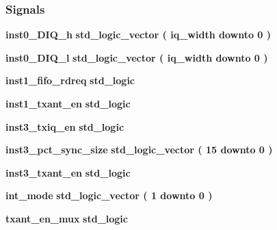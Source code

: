 \subsubsection*{Signals}
 \begin{DoxyCompactItemize}
\item 
{\bf inst0\+\_\+\+D\+I\+Q\+\_\+h} {\bfseries \textcolor{comment}{std\+\_\+logic\+\_\+vector}\textcolor{vhdlchar}{ }\textcolor{vhdlchar}{(}\textcolor{vhdlchar}{ }\textcolor{vhdlchar}{ }\textcolor{vhdlchar}{ }\textcolor{vhdlchar}{ }{\bfseries {\bf iq\+\_\+width}} \textcolor{vhdlchar}{ }\textcolor{keywordflow}{downto}\textcolor{vhdlchar}{ }\textcolor{vhdlchar}{ } \textcolor{vhdldigit}{0} \textcolor{vhdlchar}{ }\textcolor{vhdlchar}{)}\textcolor{vhdlchar}{ }} 
\item 
{\bf inst0\+\_\+\+D\+I\+Q\+\_\+l} {\bfseries \textcolor{comment}{std\+\_\+logic\+\_\+vector}\textcolor{vhdlchar}{ }\textcolor{vhdlchar}{(}\textcolor{vhdlchar}{ }\textcolor{vhdlchar}{ }\textcolor{vhdlchar}{ }\textcolor{vhdlchar}{ }{\bfseries {\bf iq\+\_\+width}} \textcolor{vhdlchar}{ }\textcolor{keywordflow}{downto}\textcolor{vhdlchar}{ }\textcolor{vhdlchar}{ } \textcolor{vhdldigit}{0} \textcolor{vhdlchar}{ }\textcolor{vhdlchar}{)}\textcolor{vhdlchar}{ }} 
\item 
{\bf inst1\+\_\+fifo\+\_\+rdreq} {\bfseries \textcolor{comment}{std\+\_\+logic}\textcolor{vhdlchar}{ }} 
\item 
{\bf inst1\+\_\+txant\+\_\+en} {\bfseries \textcolor{comment}{std\+\_\+logic}\textcolor{vhdlchar}{ }} 
\item 
{\bf inst3\+\_\+txiq\+\_\+en} {\bfseries \textcolor{comment}{std\+\_\+logic}\textcolor{vhdlchar}{ }} 
\item 
{\bf inst3\+\_\+pct\+\_\+sync\+\_\+size} {\bfseries \textcolor{comment}{std\+\_\+logic\+\_\+vector}\textcolor{vhdlchar}{ }\textcolor{vhdlchar}{(}\textcolor{vhdlchar}{ }\textcolor{vhdlchar}{ } \textcolor{vhdldigit}{15} \textcolor{vhdlchar}{ }\textcolor{keywordflow}{downto}\textcolor{vhdlchar}{ }\textcolor{vhdlchar}{ } \textcolor{vhdldigit}{0} \textcolor{vhdlchar}{ }\textcolor{vhdlchar}{)}\textcolor{vhdlchar}{ }} 
\item 
{\bf inst3\+\_\+txant\+\_\+en} {\bfseries \textcolor{comment}{std\+\_\+logic}\textcolor{vhdlchar}{ }} 
\item 
{\bf int\+\_\+mode} {\bfseries \textcolor{comment}{std\+\_\+logic\+\_\+vector}\textcolor{vhdlchar}{ }\textcolor{vhdlchar}{(}\textcolor{vhdlchar}{ }\textcolor{vhdlchar}{ } \textcolor{vhdldigit}{1} \textcolor{vhdlchar}{ }\textcolor{keywordflow}{downto}\textcolor{vhdlchar}{ }\textcolor{vhdlchar}{ } \textcolor{vhdldigit}{0} \textcolor{vhdlchar}{ }\textcolor{vhdlchar}{)}\textcolor{vhdlchar}{ }} 
\item 
{\bf txant\+\_\+en\+\_\+mux} {\bfseries \textcolor{comment}{std\+\_\+logic}\textcolor{vhdlchar}{ }} 
\end{DoxyCompactItemize}
